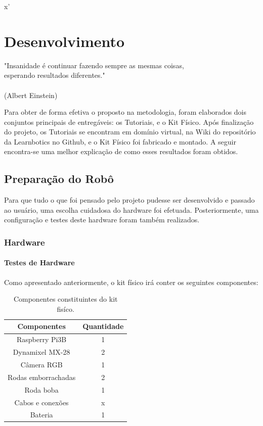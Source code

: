 x'\chapter{Desenvolvimento}
\label{chap:desen_test}
\begin{flushright}
	"Insanidade é continuar fazendo sempre as mesmas coisas, \\ 
	esperando resultados diferentes." \\
	\ \\
	(Albert Einstein)
\end{flushright}

Para obter de forma efetiva o proposto na metodologia, foram elaborados dois conjuntos principais de entregáveis: os Tutoriais, e o Kit Físico. Após finalização do projeto, os Tutoriais se encontram em domínio virtual, na Wiki do repositório da Learnbotics no Github, e o Kit Físico foi fabricado e montado. A seguir encontra-se uma melhor explicação de como esses resultados foram obtidos.

\section{Preparação do Robô}
Para que tudo o que foi pensado pelo projeto pudesse ser desenvolvido e passado ao usuário, uma escolha cuidadosa do hardware foi efetuada. Posteriormente, uma configuração e testes deste hardware foram também realizados.

\subsection{Hardware}

\subsubsection{Testes de Hardware}
Como apresentado anteriormente, o kit físico irá conter os seguintes componentes:
\begin{table}
	\centering
	\begin{small}
		\caption{Componentes constituintes do kit fisíco.} \label{Tabela1}
		\begin{tabular}{cc}
			\hline
			Componentes              & Quantidade\\
			\hline
			Raspberry Pi3B              & 1 \\
			Dynamixel MX-28			    & 2 \\
			Câmera RGB		            & 1 \\
			Rodas emborrachadas		    & 2 \\
			Roda boba		            & 1 \\
			Cabos e conexões            & x \\
			Bateria 			        & 1 \\
			\hline
		\end{tabular}
	\end{small}
\end{table}

